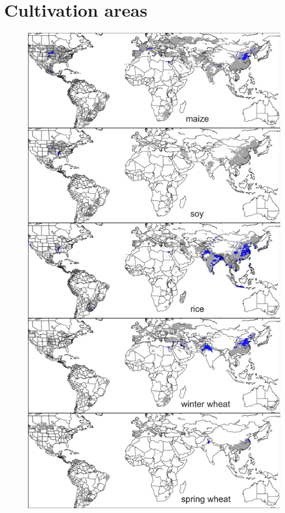 \documentclass[10pt]{article}
\begin{document}
{{\section{Cultivation areas}
\begin{figure}[h!]
\centering
\begin{minipage}{.45\textwidth}
    \centering
    \vspace{0pt}
    \includegraphics[width=\textwidth]{s_croparea_irr.png}\\

\end{minipage}
\end{figure}}}
\end{document}
